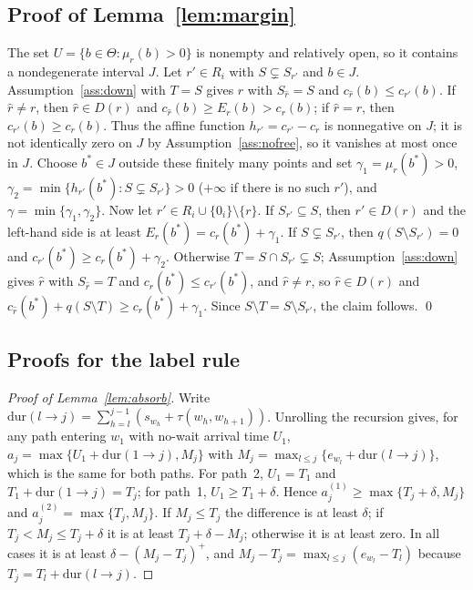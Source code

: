 \documentclass[review,12pt]{elsarticle}
\theoremstyle{definition}
\theoremstyle{remark}
\begin{document}
\subsection{Proof of Lemma~\ref{lem:margin}}

The set $U=\{b\in\Theta:\mu_r(b)>0\}$ is nonempty and relatively open, so it
contains a nondegenerate interval $J$. Let $r'\in R_i$ with $S\subsetneq S_{r'}$
and $b\in J$. Assumption~\ref{ass:down} with $T=S$ gives $\hat r$ with
$S_{\hat r}=S$ and $c_{\hat r}(b)\le c_{r'}(b)$. If $\hat r\ne r$, then
$\hat r\in D(r)$ and $c_{\hat r}(b)\ge E_r(b)>c_r(b)$; if $\hat r=r$, then
$c_{r'}(b)\ge c_r(b)$. Thus the affine function $h_{r'}=c_{r'}-c_r$ is
nonnegative on $J$; it is not identically zero on $J$ by
Assumption~\ref{ass:nofree}, so it vanishes at most once in $J$. Choose
$b^\ast\in J$ outside these finitely many points and set
$\gamma_1=\mu_r(b^\ast)>0$,
$\gamma_2=\min\{h_{r'}(b^\ast):S\subsetneq S_{r'}\}>0$ ($+\infty$ if there is no
such $r'$), and $\gamma=\min\{\gamma_1,\gamma_2\}$. Now let
$r'\in R_i\cup\{0_i\}\setminus\{r\}$. If $S_{r'}\subseteq S$, then
$r'\in D(r)$ and the left-hand side is at least $E_r(b^\ast)=c_r(b^\ast)+\gamma_1$.
If $S\subsetneq S_{r'}$, then $q(S\setminus S_{r'})=0$ and
$c_{r'}(b^\ast)\ge c_r(b^\ast)+\gamma_2$. Otherwise $T=S\cap S_{r'}\subsetneq S$;
Assumption~\ref{ass:down} gives $\hat r$ with $S_{\hat r}=T$ and
$c_{\hat r}(b^\ast)\le c_{r'}(b^\ast)$, and $\hat r\ne r$, so $\hat r\in D(r)$ and
$c_{\hat r}(b^\ast)+q(S\setminus T)\ge c_r(b^\ast)+\gamma_1$. Since
$S\setminus T=S\setminus S_{r'}$, the claim follows. \qed

\subsection{Proofs for the label rule}
\label{app:label}

\begin{proof}[Proof of Lemma~\ref{lem:absorb}]
Write $\mathrm{dur}(l\to j)=\sum_{h=l}^{j-1}(s_{w_h}+\tau(w_h,w_{h+1}))$.
Unrolling the recursion gives, for any path entering $w_1$ with no-wait
arrival time $U_1$, $a_j=\max\{U_1+\mathrm{dur}(1\to j),M_j\}$ with
$M_j=\max_{l\le j}\{e_{w_l}+\mathrm{dur}(l\to j)\}$, which is the same for both
paths. For path~2, $U_1=T_1$ and $T_1+\mathrm{dur}(1\to j)=T_j$; for path~1,
$U_1\ge T_1+\delta$. Hence $a^{(1)}_j\ge\max\{T_j+\delta,M_j\}$ and
$a^{(2)}_j=\max\{T_j,M_j\}$. If $M_j\le T_j$ the difference is at least
$\delta$; if $T_j<M_j\le T_j+\delta$ it is at least $T_j+\delta-M_j$;
otherwise it is at least zero. In all cases it is at least
$\delta-(M_j-T_j)^+$, and $M_j-T_j=\max_{l\le j}(e_{w_l}-T_l)$ because
$T_j=T_l+\mathrm{dur}(l\to j)$.
\end{proof}
\end{document}

